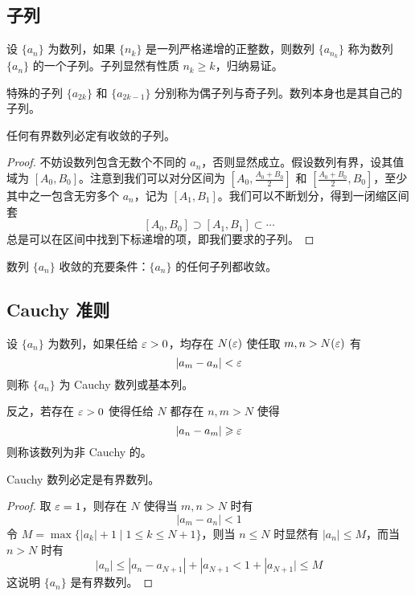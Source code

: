 \subsection{子列}

设 $\{a_n\}$ 为数列，如果 $\{n_k\}$ 是一列严格递增的正整数，则数列 $\{a_{n_k}\}$ 称为数列 $\{a_n\}$ 的一个子列。子列显然有性质 $n_k \geqslant k$，归纳易证。

特殊的子列 $\{a_{2k}\}$ 和 $\{a_{2k-1}\}$ 分别称为偶子列与奇子列。数列本身也是其自己的子列。

\begin{theorem}
	任何有界数列必定有收敛的子列。
\end{theorem}

\begin{proof}
	不妨设数列包含无数个不同的 $a_n$，否则显然成立。假设数列有界，设其值域为 $[A_0, B_0]$。注意到我们可以对分区间为 $[A_0, \frac{A_0 + B_0}{2}]$ 和 $[\frac{A_0 + B_0}{2}, B_0]$，至少其中之一包含无穷多个 $a_n$，记为 $[A_1, B_1]$。我们可以不断划分，得到一闭缩区间套
	\[ [A_0, B_0] \supset [A_1, B_1] \subset \cdots   \]
	总是可以在区间中找到下标递增的项，即我们要求的子列。
\end{proof}

\begin{theorem}
	数列 $\{a_n\}$ 收敛的充要条件：$\{a_n\}$ 的任何子列都收敛。
\end{theorem}

\subsection{Cauchy 准则}

\begin{definition}
	设 $\{a_n\}$ 为数列，如果任给 $\varepsilon>0$，均存在 $N(\varepsilon)$ 使任取 $m,n>N(\varepsilon)$ 有
	\[|a_m-a_n| < \varepsilon\]
	则称 $\{a_n\}$ 为 Cauchy 数列或基本列。
\end{definition}

反之，若存在 $\varepsilon > 0$ 使得任给 $N$ 都存在 $n, m > N$ 使得
\[ |a_n - a_m| \geqslant \varepsilon \]
则称该数列为非 Cauchy 的。

\begin{theorem}
	Cauchy 数列必定是有界数列。
\end{theorem}
\begin{proof}
	取 $\varepsilon=1$，则存在 $N$ 使得当 $m,n>N$ 时有
	\[|a_m-a_n| < 1\]
	令 $M = \max\{|a_k|+1 \mid 1 \leqslant k \leqslant N+1\}$，则当 $n\leqslant N$ 时显然有 $|a_n|\leqslant M$，而当 $n>N$ 时有
	\[|a_n| \leqslant |a_n-a_{N+1}| + |a_{N+1} < 1+ |a_{N+1}| \leqslant M\]
	这说明 $\{a_n\}$ 是有界数列。
\end{proof}

